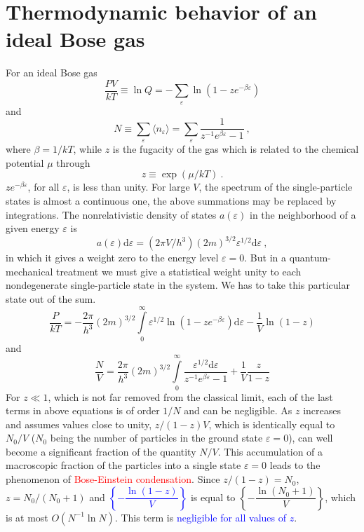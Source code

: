 \documentclass[12pt,a4paper]{article}
\newcommand{\dif}{\mathrm{d}}
\begin{document}
\section{Thermodynamic behavior of an ideal Bose gas}
For an ideal Bose gas
\begin{equation}
\frac{PV}{kT} \equiv \ln \mathit{Q} = -\sum_{\varepsilon} \ln (1-z e^{-\beta \varepsilon})
\end{equation}
and 
\begin{equation}
N \equiv \sum_\varepsilon \langle n_{\varepsilon} \rangle = \sum_\varepsilon \frac{1}{z^{-1} e^{\beta \varepsilon} -1} ~,
\end{equation}
where $\beta = 1/kT$, while $z$ is the fugacity of the gas which is related to the chemical potential $\mu$ through 
\begin{equation}
z \equiv \exp(\mu/kT) ~.
\end{equation}
$z e^{-\beta \varepsilon}$, for all $\varepsilon$, is less than unity. For large $V$, the spectrum of the single-particle states is almost a continuous one, the above summations may be replaced by integrations. The nonrelativistic density of states $a(\varepsilon)$ in the neighborhood of a given energy $\varepsilon$ is
\begin{equation}
a(\varepsilon) \dif \varepsilon = (2\pi V/h^3)(2m)^{3/2} \varepsilon^{1/2} \dif \varepsilon ~,
\end{equation}
in which it gives a weight zero to the energy level $\varepsilon = 0$. But in a quantum-mechanical treatment we must give a statistical weight unity to each nondegenerate single-particle state in the system. We has to take this particular state out of the sum.
\begin{equation}
\frac{P}{kT} = -\frac{2\pi}{h^3} (2m)^{3/2} \int\limits_0^\infty \varepsilon^{1/2} \ln(1-z e^{-\beta \varepsilon}) \dif \varepsilon -\frac{1}{V} \ln(1-z)
\end{equation}
and
\begin{equation}
\frac{N}{V} = \frac{2\pi}{h^3} (2m)^{3/2} \int\limits_0^\infty \frac{\varepsilon^{1/2} \dif \varepsilon}{z^{-1} e^{\beta \varepsilon} -1} +\frac{1}{V}\frac{z}{1-z}
\end{equation}
For $z \ll 1$, which is not far removed from the classical limit, each of the last terms in above equations is of order $1/N$ and can be negligible. As $z$ increases and assumes values close to unity, $z/(1- z)V$, which is identically equal to $N_0/V$ ($N_0$ being the number of particles in the ground state $\varepsilon = 0$), can well become a significant fraction of the quantity $N/V$. This accumulation of a macroscopic fraction of the particles into a single state $\varepsilon = 0$ leads to the phenomenon of \textcolor{red}{Bose-Einstein condensation}. Since $z/(1-z) = N_0$, $z = N_0/(N_0+1)$ and \textcolor{blue}{$\left\{-\dfrac{\ln(1-z)}{V} \right\}$} is equal to $\left\{-\dfrac{\ln(N_0+1)}{V} \right\}$, which is at most $O(N^{-1} \ln N)$. This term is \textcolor{blue}{negligible for all values of $z$}.
\end{document}
